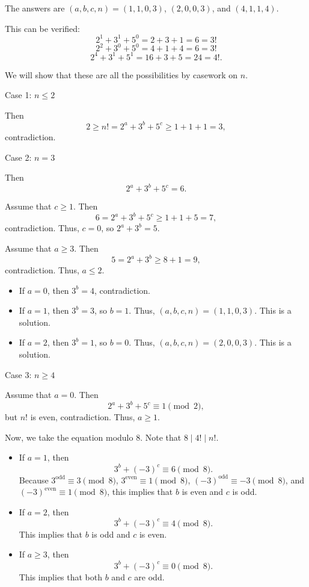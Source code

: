 The answers are $\left(a,b,c,n\right)=\boxed{\left(1,1,0,3\right)}$, $\boxed{\left(2,0,0,3\right)}$, and $\boxed{\left(4,1,1,4\right)}$.

This can be verified: \[2^1+3^1+5^0=2+3+1=6=3!\]\[2^2+3^0+5^0=4+1+4=6=3!\]\[2^4+3^1+5^1=16+3+5=24=4!.\]

We will show that these are all the possibilities by casework on $n$.

Case 1: $n\leq2$

Then \[2\geq n!=2^a+3^b+5^c\geq1+1+1=3,\] contradiction.

Case 2: $n=3$

Then \[2^a+3^b+5^c=6.\]

Assume that $c\geq1$. Then \[6=2^a+3^b+5^c\geq1+1+5=7,\] contradiction. Thus, $c=0$, so $2^a+3^b=5$.

Assume that $a\geq3$. Then \[5=2^a+3^b\geq8+1=9,\] contradiction. Thus, $a\leq2$.

\begin{itemize}
	
	\item If $a=0$, then $3^b=4$, contradiction.
	
	\item If $a=1$, then $3^b=3$, so $b=1$. Thus, $\left(a,b,c,n\right)=\left(1,1,0,3\right)$. This is a solution.
	
	\item If $a=2$, then $3^b=1$, so $b=0$. Thus, $\left(a,b,c,n\right)=\left(2,0,0,3\right)$. This is a solution.
	
\end{itemize}

Case 3: $n\geq4$

Assume that $a=0$. Then \[2^a+3^b+5^c\equiv1\pmod2,\] but $n!$ is even, contradiction. Thus, $a\geq1$.

Now, we take the equation modulo $8$. Note that $8\mid4!\mid n!$.

\begin{itemize}
	
	\item If $a=1$, then \[3^b+\left(-3\right)^c\equiv6\pmod8.\] Because $3^{\text{odd}}\equiv3\pmod8$, $3^{\text{even}}\equiv1\pmod8$, $\left(-3\right)^{\text{odd}}\equiv-3\pmod8$, and $\left(-3\right)^{\text{even}}\equiv1\pmod8$, this implies that $b$ is even and $c$ is odd.\
	
	\item If $a=2$, then \[3^b+\left(-3\right)^c\equiv4\pmod8.\] This implies that $b$ is odd and $c$ is even.
	
	\item If $a\geq3$, then \[3^b+\left(-3\right)^c\equiv0\pmod8.\] This implies that both $b$ and $c$ are odd.
	
\end{itemize}

